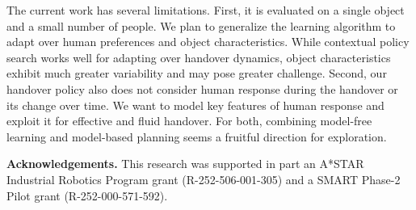 The current work has several limitations.  First, it is evaluated on a single object and a small number of people.  We plan to generalize the learning algorithm to adapt over human preferences and object characteristics.  While contextual policy search works well for adapting over handover dynamics, object characteristics exhibit much greater variability and may pose greater challenge.  Second, our handover policy also does not consider human response during the handover or its change over time.  We want to model key features of human response and exploit it for effective and fluid handover. For both, combining model-free learning and model-based planning seems a fruitful direction for exploration.

\bigskip
\textbf{Acknowledgements.}
This research was supported in part an A*STAR Industrial Robotics Program grant (R-252-506-001-305) and a SMART Phase-2 Pilot grant (R-252-000-571-592). 


